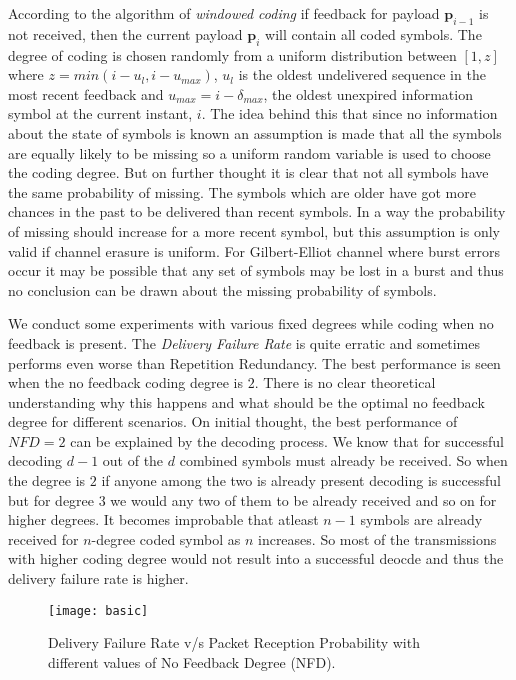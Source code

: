 According to the algorithm of \textit{windowed coding} if feedback for payload $\mathbf{p}_{i-1}$ is not received, then the current payload $\mathbf{p}_{i}$ will contain all coded symbols. The degree of coding is chosen randomly from a uniform distribution between $[1, z]$ where $z = min(i-u_l, i-u_{max})$, $u_l$ is the oldest undelivered sequence in the most recent feedback and $u_{max} = i-\delta_{max}$, the oldest unexpired information symbol at the current instant, $i$. The idea behind this that since no information about the state of symbols is known an assumption is made that all the symbols are equally likely to be missing so a uniform random variable is used to choose the coding degree. But on further thought it is clear that not all symbols have the same probability of missing. The symbols which are older have got more chances in the past to be delivered than recent symbols. In a way the probability of missing should increase for a more recent symbol, but this assumption is only valid if channel erasure is uniform. For Gilbert-Elliot channel where burst errors occur it may be possible that any set of symbols may be lost in a burst and thus no conclusion can be drawn about the missing probability of symbols.

We conduct some experiments with various fixed degrees while coding when no feedback is present. The \textit{Delivery Failure Rate} is quite erratic and sometimes performs even worse than Repetition Redundancy. The best performance is seen when the no feedback coding degree is $2$. There is no clear theoretical understanding why this happens and what should be the optimal no feedback degree for different scenarios. On initial thought, the best performance of $NFD = 2$ can be explained by the decoding process. We know that for successful decoding $d-1$ out of the $d$ combined symbols must already be received. So when the degree is $2$ if anyone among the two is already present decoding is successful but for degree $3$ we would any two of them to be already received and so on for higher degrees. It becomes improbable that atleast $n-1$ symbols are already received for $n$-degree coded symbol as $n$ increases. So most of the transmissions with higher coding degree would not result into a successful deocde and thus the delivery failure rate is higher. 


\begin{figure}[t]
	\centering
	\texttt{[image: basic]}
	\caption{Delivery Failure Rate v/s Packet Reception Probability with different values of No Feedback Degree (NFD).}
	\label{basic}
\end{figure}


